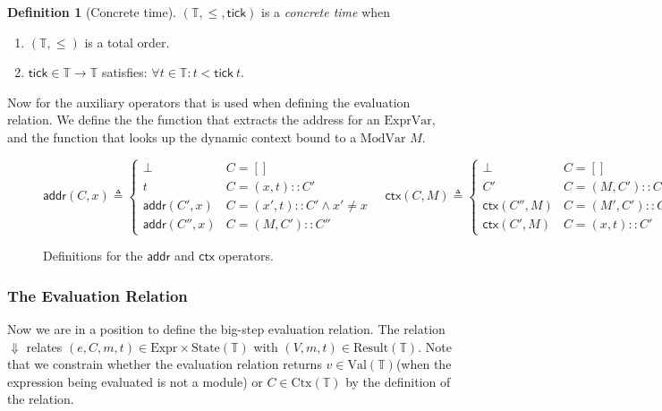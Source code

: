 \documentclass[acmsmall,screen,review]{acmart}
\theoremstyle{definition}
\newtheorem{definition}{Definition}[section]
\newcommand*{\cons}{::}
\newcommand*{\Expr}{\text{Expr}}
\newcommand*{\ExprVar}{\text{ExprVar}}
\newcommand*{\ModVar}{\text{ModVar}}
\newcommand*{\Time}{\mathbb{T}}
\newcommand*{\Ctx}[1]{\text{Ctx}({#1})}
\newcommand*{\Value}[1]{\text{Val}({#1})}
\newcommand*{\mem}{m}
\newcommand*{\Config}[1]{\text{State}({#1})}
\newcommand*{\Result}[1]{\text{Result}({#1})}
\newcommand*{\addr}{\mathsf{addr}}
\newcommand*{\tick}{\mathsf{tick}}
\newcommand*{\modctx}{\mathsf{ctx}}
\begin{document}
\begin{definition}[Concrete time]
  $(\Time, \le, \tick)$ is a \emph{concrete time} when
  \begin{enumerate}
    \item $(\Time, \le)$ is a total order.
    \item $\tick\in\Time\rightarrow\Time$ satisfies: $\forall t\in\Time: t < \tick\:t$.
  \end{enumerate}
\end{definition}

Now for the auxiliary operators that is used when defining the evaluation relation.
We define the the function that extracts the address for an $\ExprVar$,
and the function that looks up the dynamic context bound to a $\ModVar$ $M$.

\begin{figure}[h!]
  \centering
  \footnotesize
  \[
    \addr(C,x)\triangleq
    \begin{cases}
      \bot         & C=[]                              \\
      t            & C=(x, t)\cons C'                  \\
      \addr(C',x)  & C=(x', t)\cons C' \wedge x'\neq x \\
      \addr(C'',x) & C=(M, C')\cons C''
    \end{cases}
    \quad
    \modctx(C,M)\triangleq
    \begin{cases}
      \bot           & C=[]                               \\
      C'             & C=(M, C')\cons C''                 \\
      \modctx(C'',M) & C=(M', C')\cons C''\wedge M'\neq M \\
      \modctx(C',M)  & C=(x, t)\cons C'
    \end{cases}
  \]
  \caption{Definitions for the $\addr$ and $\modctx$ operators.}
\end{figure}

\subsubsection{The Evaluation Relation}

Now we are in a position to define the big-step evaluation relation.
The relation $\Downarrow$ relates $(e,C,\mem,t)\in\Expr\times\Config{\Time}$ with
$(V,\mem,t)\in\Result{\Time}$.
Note that we constrain whether the evaluation relation returns $v\in\Value{\Time}$(when the expression being evaluated is not a module) or $C\in\Ctx{\Time}$ by the definition of the relation.
\end{document}
